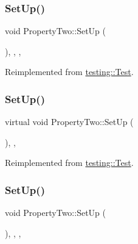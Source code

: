 \subsubsection{\texorpdfstring{SetUp()}{SetUp()}\hspace{0.1cm}{\footnotesize\ttfamily [1/3]}}
{\footnotesize\ttfamily void Property\+Two\+::\+Set\+Up (\begin{DoxyParamCaption}{ }\end{DoxyParamCaption})\hspace{0.3cm}{\ttfamily [inline]}, {\ttfamily [override]}, {\ttfamily [protected]}, {\ttfamily [virtual]}}



Reimplemented from \mbox{\hyperlink{classtesting_1_1_test_a190315150c303ddf801313fd1a777733}{testing\+::\+Test}}.

\mbox{\label{class_property_two_aa3ab39cf4e6c751cb0788c575bf92ca2}} 
\subsubsection{\texorpdfstring{SetUp()}{SetUp()}\hspace{0.1cm}{\footnotesize\ttfamily [2/3]}}
{\footnotesize\ttfamily virtual void Property\+Two\+::\+Set\+Up (\begin{DoxyParamCaption}{ }\end{DoxyParamCaption})\hspace{0.3cm}{\ttfamily [inline]}, {\ttfamily [protected]}, {\ttfamily [virtual]}}



Reimplemented from \mbox{\hyperlink{classtesting_1_1_test_a190315150c303ddf801313fd1a777733}{testing\+::\+Test}}.

\mbox{\label{class_property_two_a88216ddb0ed17e58c9f974a743208fca}} 
\subsubsection{\texorpdfstring{SetUp()}{SetUp()}\hspace{0.1cm}{\footnotesize\ttfamily [3/3]}}
{\footnotesize\ttfamily void Property\+Two\+::\+Set\+Up (\begin{DoxyParamCaption}{ }\end{DoxyParamCaption})\hspace{0.3cm}{\ttfamily [inline]}, {\ttfamily [override]}, {\ttfamily [protected]}, {\ttfamily [virtual]}}



